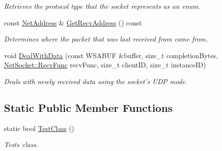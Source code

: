 \begin{DoxyCompactItemize}
\begin{DoxyCompactList}\small\item\em Retrieves the protocol type that the socket represents as an enum. \item\end{DoxyCompactList}\item 
const \hyperlink{class_net_address}{NetAddress} \& \hyperlink{class_net_socket_u_d_p_afd1821663f6a220158afd74079787c8f}{GetRecvAddress} () const 
\begin{DoxyCompactList}\small\item\em Determines where the packet that was last received from came from. \item\end{DoxyCompactList}\item 
void \hyperlink{class_net_socket_u_d_p_a433c0374fee477952c0b89b128cd2df6}{DealWithData} (const WSABUF \&buffer, size\_\-t completionBytes, \hyperlink{class_net_socket_a52b5f4de8d0a47fd8620f542b21c076c}{NetSocket::RecvFunc} recvFunc, size\_\-t clientID, size\_\-t instanceID)
\begin{DoxyCompactList}\small\item\em Deals with newly received data using the socket's UDP mode. \item\end{DoxyCompactList}\end{DoxyCompactItemize}
\subsection*{Static Public Member Functions}
\begin{DoxyCompactItemize}
\item 
static bool \hyperlink{class_net_socket_u_d_p_a68728f4e9718f3f730a8f28c94a91968}{TestClass} ()
\begin{DoxyCompactList}\small\item\em Tests class. \item\end{DoxyCompactList}\end{DoxyCompactItemize}
